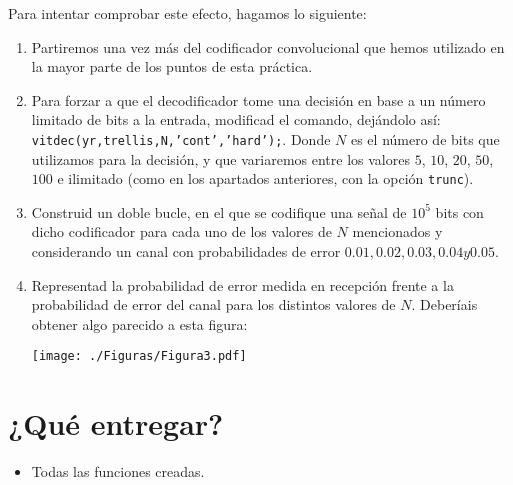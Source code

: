 \documentclass[es,practica,12pt]{uah}
\begin{document}
Para intentar comprobar este efecto, hagamos lo siguiente:

\begin{enumerate}
\item Partiremos una vez más del codificador convolucional que hemos utilizado en la mayor parte de los puntos de esta práctica. 
\item Para forzar a que el decodificador tome una decisión en base a un número limitado de bits a la entrada, modificad el comando, dejándolo así: \texttt{vitdec(yr,trellis,N,'cont','hard');}. Donde $N$ es el número de bits que utilizamos para la decisión, y que variaremos entre los valores $5$, $10$, $20$, $50$, $100$ e ilimitado (como en los apartados anteriores, con la opción \texttt{trunc}).
\item Construid un doble bucle, en el que se codifique una señal de $10^5$ bits con dicho codificador para cada uno de los valores de $N$ mencionados y considerando un canal con probabilidades de error $0.01, 0.02, 0.03, 0.04 y 0.05$. 
\item Representad la probabilidad de error medida en recepción frente a la probabilidad de error del canal para los distintos valores de $N$. Deberíais obtener algo parecido a esta figura:

\centering\texttt{[image: ./Figuras/Figura3.pdf]}
\end{enumerate}

\section{¿Qué entregar?}
\begin{itemize}
	\item Todas las funciones creadas.
\end{itemize}


\end{document}
